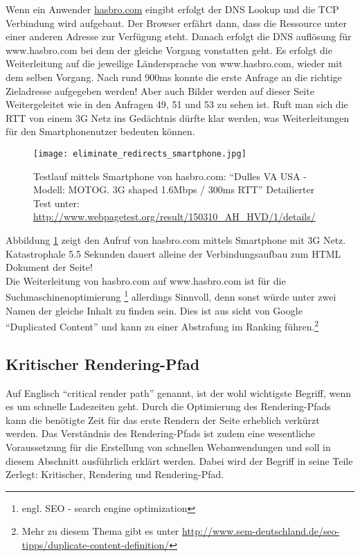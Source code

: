 \begin{itemize}
			Wenn ein Anwender \url{hasbro.com} eingibt erfolgt der DNS Lookup und die TCP Verbindung wird aufgebaut. Der Browser erfährt dann, dass die Ressource unter einer anderen Adresse zur Verfügung steht. Danach erfolgt die DNS auflösung für www.hasbro.com bei dem der gleiche Vorgang vonstatten geht. Es erfolgt die Weiterleitung auf die jeweilige Ländersprache von www.hasbro.com, wieder mit dem selben Vorgang. Nach rund 900ms konnte die erste Anfrage an die richtige Zieladresse aufgegeben werden! Aber auch Bilder werden auf dieser Seite Weitergeleitet wie in den Anfragen 49, 51 und 53 zu sehen ist. Ruft man sich die RTT von einem 3G Netz ins Gedächtnis dürfte klar werden, was Weiterleitungen für den Smartphonenutzer bedeuten können. \\

			\begin{figure}[htbp]
				\begin{center}
					\texttt{[image: eliminate\_redirects\_smartphone.jpg]}
					\caption{Testlauf mittels Smartphone von hasbro.com: "`Dulles VA USA - Modell: MOTOG. 3G shaped 1.6Mbps / 300ms RTT"' Detailierter Test unter: \url{http://www.webpagetest.org/result/150310_AH_HVD/1/details/}}
					\label{fig:eliminate_redirects_smartphone}
				\end{center}
			\end{figure}

			Abbildung \ref{fig:eliminate_redirects_smartphone} zeigt den Aufruf von hasbro.com mittels Smartphone mit 3G Netz. Katastrophale 5.5 Sekunden dauert alleine der Verbindungsaufbau zum HTML Dokument der Seite!\\

			Die Weiterleitung von hasbro.com auf www.hasbro.com ist für die Suchmaschinenoptimierung \footnote{engl. SEO - search engine optimization} allerdings Sinnvoll, denn sonst würde unter zwei Namen der gleiche Inhalt zu finden sein. Dies ist aus sicht von Google "`Duplicated Content"' und kann zu einer Abstrafung im Ranking führen.\footnote{Mehr zu diesem Thema gibt es unter \url{http://www.sem-deutschland.de/seo-tipps/duplicate-content-definition/}}

		\end{itemize}



	\subsection{Kritischer Rendering-Pfad} %
	\label{sub:critical_render_path}
		Auf Englisch "`critical render path"' genannt, ist der wohl wichtigste Begriff, wenn es um schnelle Ladezeiten geht. Durch die Optimierung des Rendering-Pfads kann die benötigte Zeit für das erste Rendern der Seite erheblich verkürzt werden. Das Verständnis des Rendering-Pfads ist zudem eine wesentliche Voraussetzung für die Erstellung von schnellen Webanwendungen und soll in diesem Abschnitt ausführlich erklärt werden. Dabei wird der Begriff in seine Teile Zerlegt: Kritischer, Rendering und Rendering-Pfad.\\

